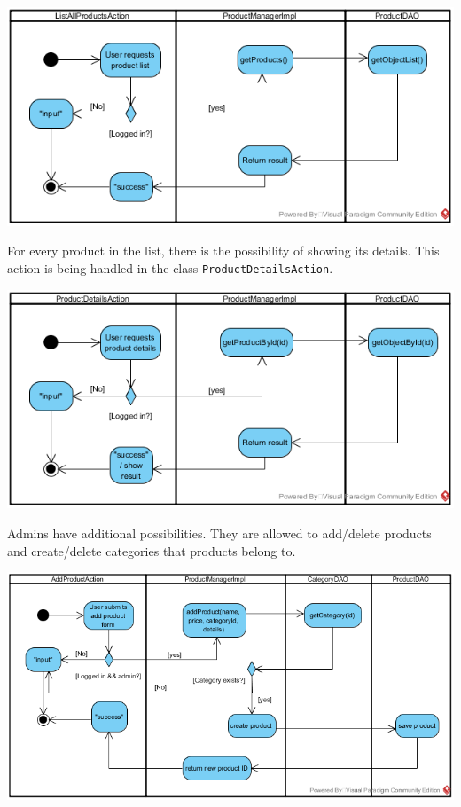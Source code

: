 \documentclass[11pt]{article}
\begin{document}
    
		\begin{center}
		\includegraphics[width=\textwidth]{img/products/list}
		\end{center}
		
		
	For every product in the list, there is the possibility of showing its details. This action is being handled in the class \texttt{ProductDetailsAction}.
	\begin{center}
	\includegraphics[width=\textwidth]{img/products/details}
	\end{center}
	
	Admins have additional possibilities. They are allowed to add/delete products and create/delete categories that products belong to.
	\begin{center}
	\includegraphics[width=\textwidth]{img/products/createproduct}
	\end{center}
	
\end{document}
